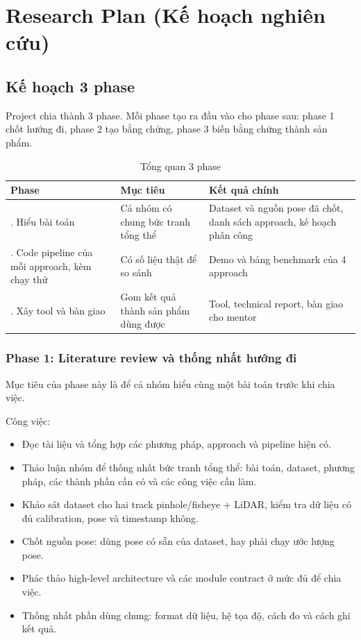 \chapter{Research Plan (Kế hoạch nghiên cứu)}

\section{Kế hoạch 3 phase}

Project chia thành 3 phase.
Mỗi phase tạo ra đầu vào cho phase sau: phase 1 chốt hướng đi, phase 2 tạo bằng chứng, phase 3 biến bằng chứng thành sản phẩm.

\begin{table}[H]
  \centering
  \caption{Tổng quan 3 phase}
  \begin{tabularx}{\linewidth}{>{\raggedright\arraybackslash}p{3.3cm} X X}
    \toprule
    \textbf{Phase} & \textbf{Mục tiêu} & \textbf{Kết quả chính} \\
    \midrule
    1. Hiểu bài toán & Cả nhóm có chung bức tranh tổng thể & Dataset và nguồn pose đã chốt, danh sách approach, kế hoạch phân công \\
    \addlinespace
    2. Code pipeline của mỗi approach, kèm chạy thử & Có số liệu thật để so sánh & Demo và bảng benchmark của 4 approach \\
    \addlinespace
    3. Xây tool và bàn giao & Gom kết quả thành sản phẩm dùng được & Tool, technical report, bàn giao cho mentor \\
    \bottomrule
  \end{tabularx}
\end{table}

\subsection{Phase 1: Literature review và thống nhất hướng đi}

Mục tiêu của phase này là để cả nhóm hiểu cùng một bài toán trước khi chia việc.

Công việc:
\begin{itemize}
  \item Đọc tài liệu và tổng hợp các phương pháp, approach và pipeline hiện có.
  \item Thảo luận nhóm để thống nhất bức tranh tổng thể: bài toán, dataset, phương pháp, các thành phần cần có và các công việc cần làm.
  \item Khảo sát dataset cho hai track pinhole/fisheye + LiDAR, kiểm tra dữ liệu có đủ calibration, pose và timestamp không.
  \item Chốt nguồn pose: dùng pose có sẵn của dataset, hay phải chạy ước lượng pose.
  \item Phác thảo high-level architecture và các module contract ở mức đủ để chia việc.
  \item Thống nhất phần dùng chung: format dữ liệu, hệ tọa độ, cách đo và cách ghi kết quả.
\end{itemize}

